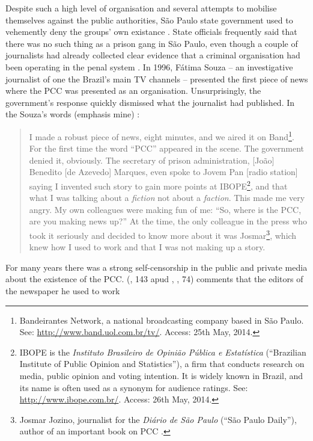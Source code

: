 Despite such a high level of organisation and several attempts to mobilise themselves against the public authorities, S\~{a}o Paulo state government used to vehemently deny the groups' own existance \citep[]{bbc2012pcc}. State officials frequently said that there was no such thing as a prison gang in S\~{a}o Paulo, even though a couple of journalists had already collected clear evidence that a criminal organisation had been operating in the penal system \citep[]{jozino2004cobras, souza2007pcc}. In 1996, F\'{a}tima Souza -- an investigative journalist of one the Brazil's main TV channels -- presented the first piece of news where the PCC was presented as an organisation. Unsurprisingly, the government's response quickly dismissed what the journalist had published. In the Souza's words (emphasis mine) \citep[]{obs2007pcc}:

\begin{quotation}
I made a robust piece of news, eight minutes, and we aired it on Band\footnote{Bandeirantes Network, a national broadcasting company based in S\~{a}o Paulo. See: \href{http://www.band.uol.com.br/tv/}{http://www.band.uol.com.br/tv/}. Access:  25th May, 2014.}. For the first time the word ``PCC'' appeared in the scene. The government denied it, obviously. The secretary of prison administration, [Jo\~{a}o] Benedito [de Azevedo] Marques, even spoke to Jovem Pan [radio station] saying I invented such story to gain more points at IBOPE\footnote{IBOPE is the \textit{Instituto Brasileiro de Opini\~{a}o P\'{u}blica e Estat\'{i}stica} (``Brazilian Institute of Public Opinion and Statistics''), a firm that conducts research on media, public opinion and voting intention. It is widely known in Brazil, and its name is often used as a synonym for audience ratings. See: \href{http://www.ibope.com.br/}{http://www.ibope.com.br/}. Access:  26th May, 2014.}, and that what I was talking about a \textit{fiction} not about a \textit{faction}. This made me very angry. My own colleagues were making fun of me: ``So, where is the PCC, are you making news up?'' At the time, the only colleague in the press who took it seriously and decided to know more about it was Josmar\footnote{Josmar Jozino, journalist for the \textit{Di\'{a}rio de S\~{a}o Paulo} (``S\~{a}o Paulo Daily''), author of an important book on PCC \citep[]{jozino2004cobras}.}, which knew how I used to work and that I was not making up a story.
\end{quotation}

For many years there was a strong self-censorship in the public and private media about the existence of the PCC. \citeauthor{jozino2004cobras} (\citeyear{jozino2004cobras}, 143 apud \citeauthor{biondi2010junto}, \citeyear{biondi2010junto}, 74) comments that the editors of the newspaper he used to work

